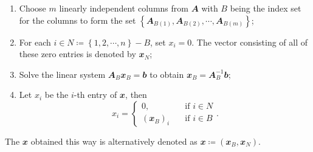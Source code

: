 \documentclass[math, code]{amznotes}
\theoremstyle{remark}
\begin{document}
\begin{enumerate}
    \item Choose $m$ linearly independent columns from $\mathbfit{A}$ with $B$ being the index set for the columns to form the set $\left\{\mathbfit{A}_{B(1)}, \mathbfit{A}_{B(2)}, \cdots, \mathbfit{A}_{B(m)}\right\}$;
    \item For each $i \in N \coloneqq \left\{1, 2, \cdots, n\right\} - B$, set $x_i = 0$. The vector consisting of all of these zero entries is denoted by $\mathbfit{x}_N$;
    \item Solve the linear system $\mathbfit{A}_B\mathbfit{x}_B = \mathbfit{b}$ to obtain $\mathbfit{x}_B = \mathbfit{A}_B^{-1}\mathbfit{b}$;
    \item Let $x_i$ be the $i$-th entry of $\mathbfit{x}$, then 
    \begin{equation*}
        x_i = \begin{cases}
            0, & \quad\textrm{if } i \in N \\
            (\mathbfit{x}_B)_i & \quad\textrm{if } i \in B
        \end{cases}.
    \end{equation*}
\end{enumerate}
The $\mathbfit{x}$ obtained this way is alternatively denoted as $\mathbfit{x} \coloneqq (\mathbfit{x}_B, \mathbfit{x}_N)$.
\end{document}
